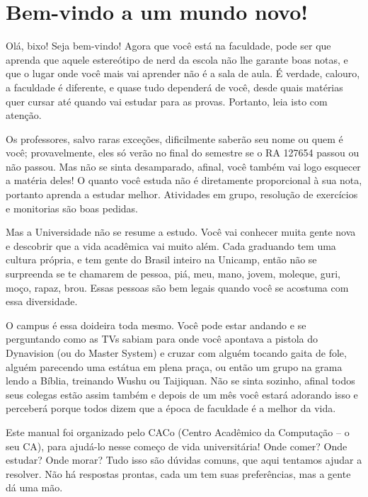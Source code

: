 
\section{Bem-vindo a um mundo novo!}

Olá, bixo! Seja bem-vindo! Agora que você está na faculdade, pode ser que aprenda que aquele estereótipo de nerd
da escola não lhe garante boas notas, e que o lugar onde você mais vai aprender não
é a sala de aula. É verdade, calouro, a faculdade é diferente, e quase tudo
dependerá de você, desde quais matérias quer cursar até quando vai estudar para
as provas. Portanto, leia isto com atenção.

Os professores, salvo raras exceções, dificilmente saberão seu nome ou quem é você; provavelmente, eles só verão
no final do semestre se o RA 127654  passou ou não passou. Mas não se sinta
desamparado, afinal, você também vai logo esquecer a matéria deles! O quanto você
estuda não é diretamente proporcional à sua nota, portanto aprenda a estudar
melhor. Atividades em grupo, resolução de exercícios e monitorias são boas pedidas.

Mas a Universidade não se resume a estudo. Você vai conhecer muita gente nova e
descobrir que a vida acadêmica vai muito além.
Cada graduando tem uma cultura própria, e tem gente do
Brasil inteiro na Unicamp, então não se surpreenda se te chamarem de
pessoa, piá, meu, mano, jovem, moleque, guri, moço, rapaz,
brou. Essas pessoas são bem legais quando você se acostuma com essa
diversidade.

O campus é essa doideira toda mesmo. Você pode estar andando e se perguntando
como as TVs sabiam para onde você apontava a pistola do Dynavision (ou do
Master System) e cruzar com alguém tocando gaita de fole, alguém parecendo uma
estátua em plena praça, ou então um grupo na grama lendo a Bíblia, treinando
Wushu ou Taijiquan. Não se sinta sozinho, afinal todos seus colegas estão assim
também e depois de um mês você estará adorando isso e perceberá porque todos
dizem que a época de faculdade é a melhor da vida.

Este manual foi organizado pelo CACo (Centro Acadêmico da Computação -- o seu
CA), para ajudá-lo nesse começo de vida universitária! Onde comer? Onde estudar?
Onde morar? Tudo isso são dúvidas comuns, que aqui tentamos ajudar a resolver.
Não há respostas prontas, cada um tem suas preferências, mas a gente dá uma mão.

